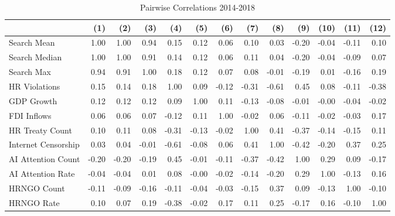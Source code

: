 \begin{table}[ht]
\centering
\begin{tabular}{|l|rrrrrrrrrrrr|}
  \hline
 & (1) & (2) & (3) & (4) & (5) & (6) & (7) & (8) & (9) & (10) & (11) & (12) \\ 
  \hline
Search Mean & 1.00 & 1.00 & 0.94 & 0.15 & 0.12 & 0.06 & 0.10 & 0.03 & -0.20 & -0.04 & -0.11 & 0.10 \\ 
  Search Median & 1.00 & 1.00 & 0.91 & 0.14 & 0.12 & 0.06 & 0.11 & 0.04 & -0.20 & -0.04 & -0.09 & 0.07 \\ 
  Search Max & 0.94 & 0.91 & 1.00 & 0.18 & 0.12 & 0.07 & 0.08 & -0.01 & -0.19 & 0.01 & -0.16 & 0.19 \\ 
  HR Violations & 0.15 & 0.14 & 0.18 & 1.00 & 0.09 & -0.12 & -0.31 & -0.61 & 0.45 & 0.08 & -0.11 & -0.38 \\ 
  GDP Growth & 0.12 & 0.12 & 0.12 & 0.09 & 1.00 & 0.11 & -0.13 & -0.08 & -0.01 & -0.00 & -0.04 & -0.02 \\ 
  FDI Inflows & 0.06 & 0.06 & 0.07 & -0.12 & 0.11 & 1.00 & -0.02 & 0.06 & -0.11 & -0.02 & -0.03 & 0.17 \\ 
  HR Treaty Count & 0.10 & 0.11 & 0.08 & -0.31 & -0.13 & -0.02 & 1.00 & 0.41 & -0.37 & -0.14 & -0.15 & 0.11 \\ 
  Internet Censorship & 0.03 & 0.04 & -0.01 & -0.61 & -0.08 & 0.06 & 0.41 & 1.00 & -0.42 & -0.20 & 0.37 & 0.25 \\ 
  AI Attention Count & -0.20 & -0.20 & -0.19 & 0.45 & -0.01 & -0.11 & -0.37 & -0.42 & 1.00 & 0.29 & 0.09 & -0.17 \\ 
  AI Attention Rate & -0.04 & -0.04 & 0.01 & 0.08 & -0.00 & -0.02 & -0.14 & -0.20 & 0.29 & 1.00 & -0.13 & 0.16 \\ 
  HRNGO Count & -0.11 & -0.09 & -0.16 & -0.11 & -0.04 & -0.03 & -0.15 & 0.37 & 0.09 & -0.13 & 1.00 & -0.10 \\ 
  HRNGO Rate & 0.10 & 0.07 & 0.19 & -0.38 & -0.02 & 0.17 & 0.11 & 0.25 & -0.17 & 0.16 & -0.10 & 1.00 \\ 
   \hline
\end{tabular}
\caption{Pairwise Correlations 2014-2018} 
\end{table}

